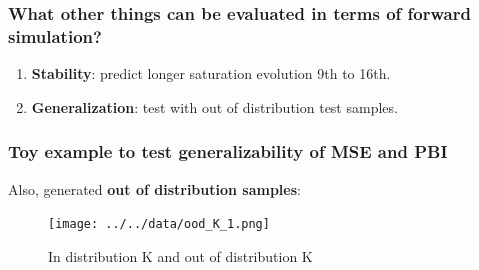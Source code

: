 \documentclass[
]{article}
\providecommand{\tightlist}{%
  \setlength{\itemsep}{0pt}\setlength{\parskip}{0pt}}\usepackage{longtable,booktabs,array}
\begin{document}
\subsubsection{What other things can be evaluated in terms of forward
simulation?}\label{what-other-things-can-be-evaluated-in-terms-of-forward-simulation}

\begin{enumerate}
\def\labelenumi{\arabic{enumi}.}
\tightlist
\item
  \textbf{Stability}: predict longer saturation evolution 9th to 16th.
\item
  \textbf{Generalization}: test with out of distribution test samples.
\end{enumerate}

\subsubsection{Toy example to test generalizability of MSE and
PBI}\label{toy-example-to-test-generalizability-of-mse-and-pbi}

Also, generated \textbf{out of distribution samples}:

\begin{figure}

\begin{minipage}{0.50\linewidth}

\texttt{[image: ../../data/ood\_K\_1.png]}

\end{minipage}%
%
\begin{minipage}{0.50\linewidth}



\end{minipage}%

\caption{\label{fig-K}In distribution K and out of distribution K}

\end{figure}%
\end{document}

